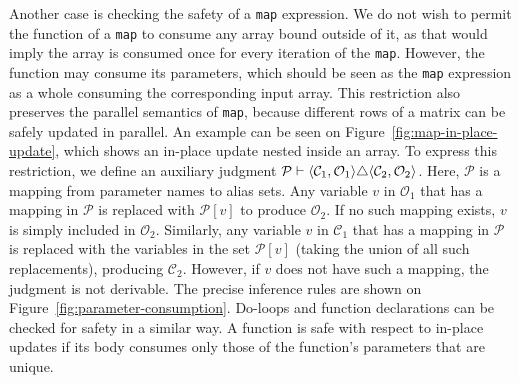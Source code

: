 Another case is checking the safety of a \lstinline{map} expression.
We do not wish to permit the function of a \lstinline{map} to consume
any array bound outside of it, as that would imply the array is
consumed once for every iteration of the \lstinline{map}.  However,
the function may consume its parameters, which should be seen as the
\lstinline{map} expression as a whole consuming the corresponding
input array.  This restriction also preserves the parallel semantics
of \lstinline{map}, because different rows of a matrix can be safely
updated in parallel.  An example can be seen on
Figure~\ref{fig:map-in-place-update}, which shows an in-place update
nested inside an array.  To express this restriction, we define an
auxiliary judgment
$\mathcal{P} \vdash \langle\mathcal{C}_{1},\mathcal{O}_{1}\rangle \triangle \langle\mathcal{C}_{2},\mathcal{O}_{2}\rangle$.
%
Here, $\mathcal{P}$ is a mapping from parameter names to alias sets.
Any variable $v$ in $\mathcal{O}_{1}$ that has a mapping in
$\mathcal{P}$ is replaced with $\mathcal{P}[v]$ to produce
$\mathcal{O}_{2}$.  If no such mapping exists, $v$ is simply included
in $\mathcal{O}_{2}$.  Similarly, any variable $v$ in
$\mathcal{C}_{1}$ that has a mapping in $\mathcal{P}$ is replaced with
the variables in the set $\mathcal{P}[v]$ (taking the union of all
such replacements), producing $\mathcal{C}_{2}$.  However, if $v$ does
not have such a mapping, the judgment is not derivable.
%
The precise inference rules are shown on
Figure~\ref{fig:parameter-consumption}.
%
Do-loops and function declarations can be checked for safety in a
similar way.  A function is safe with respect to in-place updates if
its body consumes only those of the function's parameters that are
unique.


